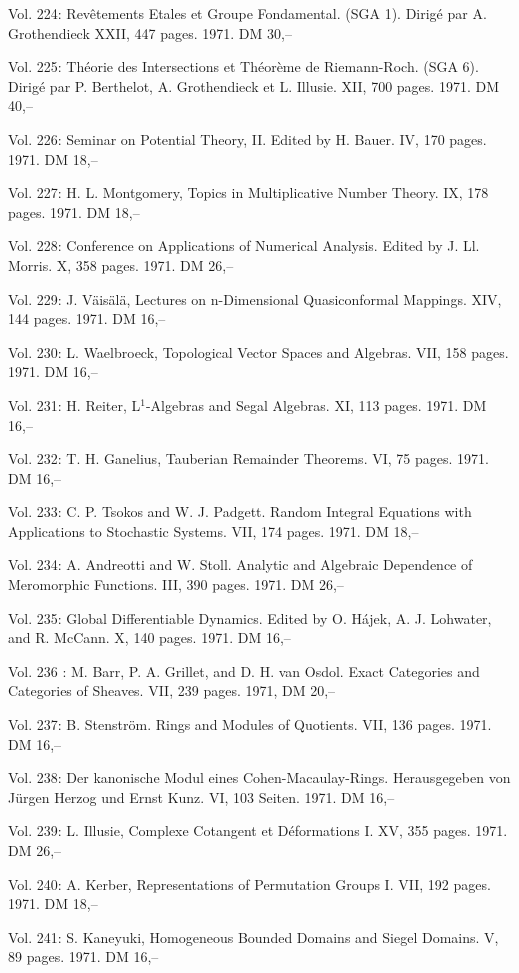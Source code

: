Vol. 224: Revêtements Etales et Groupe Fondamental. (SGA 1). Dirigé par A. Grothendieck XXII, 447 pages. 1971. DM 30,--

Vol. 225: Théorie des Intersections et Théorème de Riemann-Roch. (SGA 6). Dirigé par P. Berthelot, A. Grothendieck et L. Illusie. XII, 700 pages. 1971. DM 40,--

Vol. 226: Seminar on Potential Theory, II. Edited by H. Bauer. IV, 170 pages. 1971. DM 18,--

Vol. 227: H. L. Montgomery, Topics in Multiplicative Number Theory. IX, 178 pages. 1971. DM 18,--

Vol. 228: Conference on Applications of Numerical Analysis. Edited by J. Ll. Morris. X, 358 pages. 1971. DM 26,--

Vol. 229: J. Väisälä, Lectures on n-Dimensional Quasiconformal Mappings. XIV, 144 pages. 1971. DM 16,--

Vol. 230: L. Waelbroeck, Topological Vector Spaces and Algebras. VII, 158 pages. 1971. DM 16,--

Vol. 231: H. Reiter, L$^1$-Algebras and Segal Algebras. XI, 113 pages. 1971. DM 16,--

Vol. 232: T. H. Ganelius, Tauberian Remainder Theorems. VI, 75 pages. 1971. DM 16,--

Vol. 233: C. P. Tsokos and W. J. Padgett. Random Integral Equations with Applications to Stochastic Systems. VII, 174 pages. 1971. DM 18,--

Vol. 234: A. Andreotti and W. Stoll. Analytic and Algebraic Dependence of Meromorphic Functions. III, 390 pages. 1971. DM 26,--

Vol. 235: Global Differentiable Dynamics. Edited by O. Hájek, A. J. Lohwater, and R. McCann. X, 140 pages. 1971. DM 16,--

Vol. 236 : M. Barr, P. A. Grillet, and D. H. van Osdol. Exact Categories and Categories of Sheaves. VII, 239 pages. 1971, DM 20,--

Vol. 237: B. Stenström. Rings and Modules of Quotients. VII, 136 pages. 1971. DM 16,--

Vol. 238: Der kanonische Modul eines Cohen-Macaulay-Rings. Herausgegeben von Jürgen Herzog und Ernst Kunz. VI, 103 Seiten. 1971. DM 16,--

Vol. 239: L. Illusie, Complexe Cotangent et Déformations I. XV, 355 pages. 1971. DM 26,--

Vol. 240: A. Kerber, Representations of Permutation Groups I. VII, 192 pages. 1971. DM 18,--

Vol. 241: S. Kaneyuki, Homogeneous Bounded Domains and Siegel Domains. V, 89 pages. 1971. DM 16,--

